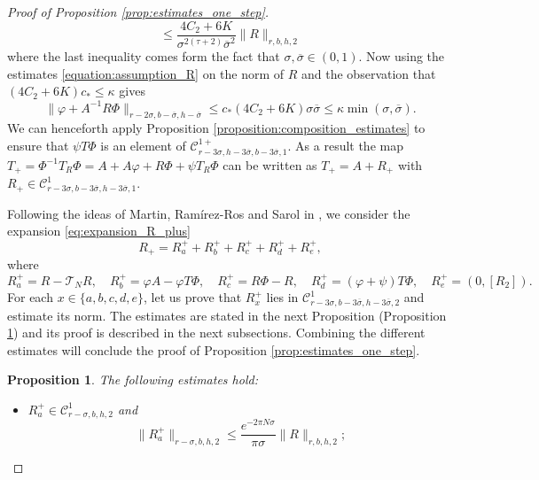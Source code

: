 \documentclass[10pt]{article}
\newtheorem{proposition}[theorem]{Proposition}
\newtheorem*{remark}{Remark}
\begin{document}
\begin{proof}[Proof of Proposition \ref{prop:estimates_one_step}]
\begin{equation}
\leq 
\frac{4C_2+6K}{\sigma^{2(\tau+2)}\overline\sigma^2}
\|R\|_{r,b,h,2}
\end{equation}
where the last inequality comes form the fact that $\sigma,\overline\sigma\in(0,1)$.
Now using the estimates \eqref{equation:assumption_R} on the norm of $R$ and the observation that $(4C_2+6K)c_\ast \leq \kappa$ gives
\begin{equation}
\label{eq:phi_plus_R_bis}
\|\varphi+A^{-1}R\Phi\|_{r - 2\sigma, b - \overline \sigma, h - \overline \sigma}
\leq 
c_\ast(4C_2+6K)
\sigma\overline\sigma
\leq \kappa \min(\sigma,\overline\sigma).
\end{equation}
We can henceforth apply Proposition \ref{proposition:composition_estimates} to ensure that $\psi T\Phi$ is an element of $\mathscr C^{1+}_{r-3\sigma,h-3\overline\sigma,b-3\overline\sigma,1}$. 
As a result the map $T_+ = \Phi^{-1}T_R\Phi = A + A\varphi + R\Phi + \psi T_R\Phi$ can be written as $T_+=A+R_+$ with $R_+\in\mathscr C^1_{r-3\sigma,b-3\overline\sigma,h-3\overline\sigma,1}$.


Following the ideas of Martin, Ram\'irez-Ros and Sarol in \cite{MartinRamirezTamarit}, we consider the expansion \eqref{eq:expansion_R_plus}
\[
R_+ = R_a^++R_b^++R_c^++R_d^+ +  R_e^+,
\]
where
\[
R_a^+ = R - \mathscr T_NR,
\quad
R_b^+ = \varphi A - \varphi T\Phi,
\quad
R_c^+ = R\Phi - R,
\quad
R_d^+ = (\varphi + \psi)T \Phi,
\quad
R_e^+ = (0, [R_2]).
\]
For each $x\in \{a,b,c,d,e\}$, let us prove that $R^+_x$ lies in $\mathscr C^1_{r-3\sigma,b-3\overline\sigma,h-3\overline\sigma,2}$ and estimate its norm. The estimates are stated in the next Proposition (Proposition \ref{prop:estimates_each_term}) and its proof is described in the next subsections. Combining the different estimates will conclude the proof of Proposition \ref{prop:estimates_one_step}.

\begin{proposition}
\label{prop:estimates_each_term}
The following estimates hold:
    \begin{itemize}
        \item[a.] $R_a^+\in\mathscr C^1_{r-\sigma,b,h,2}$ and
        \[\|R_a^+\|_{r-\sigma,b,h,2} \leq \frac{e^{-2\pi N\sigma}}{\pi\sigma} \|R\|_{r,b,h,2};\]
        

\end{itemize}
\end{proposition}
\end{proof}
\end{document}
